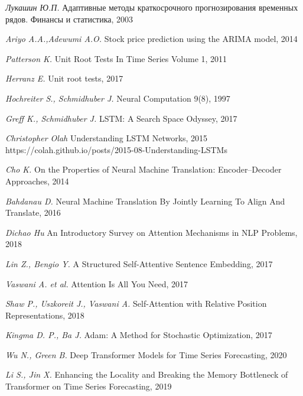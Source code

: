 \newpage

\begin{thebibliography}{99}

    \textit{Лукашин Ю.П.} Адаптивные методы краткосрочного прогнозирования временных рядов. Финансы и статистика, 2003

    \textit{Ariyo A.A.,Adewumi A.O.} Stock price prediction using the ARIMA model, 2014

    \textit{Patterson K.} Unit Root Tests In Time Series Volume 1, 2011

    \textit{Herranz E.} Unit root tests, 2017

    \textit{Hochreiter S., Schmidhuber J.} Neural Computation 9(8), 1997

    \textit{Greff K., Schmidhuber J.} LSTM: A Search Space Odyssey, 2017

    \textit{Christopher Olah} Understanding LSTM Networks, 2015 \\
    https://colah.github.io/posts/2015-08-Understanding-LSTMs

    \textit{Cho K.} On the Properties of Neural Machine Translation: Encoder–Decoder Approaches, 2014

    \textit{Bahdanau D.} Neural Machine Translation By Jointly Learning To Align And Translate, 2016

    \textit{Dichao Hu} An Introductory Survey on Attention Mechanisms in NLP Problems, 2018

    \textit{Lin Z., Bengio Y.} A Structured Self-Attentive Sentence Embedding, 2017

    \textit{Vaswani A. et al.} Attention Is All You Need, 2017

    \textit{Shaw P., Uszkoreit J., Vaswani A.} Self-Attention with Relative Position Representations, 2018

    \textit{Kingma D. P., Ba J.} Adam: A Method for Stochastic Optimization, 2017

    \textit{Wu N., Green B.} Deep Transformer Models for Time Series Forecasting, 2020

    \textit{Li S., Jin X.} Enhancing the Locality and Breaking the Memory Bottleneck of Transformer on Time Series Forecasting, 2019


\end{thebibliography}

